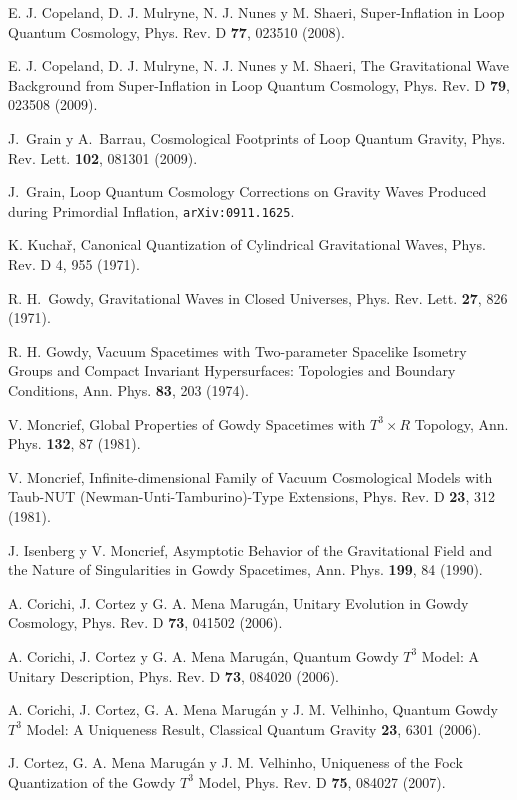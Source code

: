 \begin{thebibliography}{999}
 E. J. Copeland, D. J. Mulryne, N. J. Nunes y M. Shaeri, Super-Inflation in Loop
Quantum Cosmology, Phys. Rev. D {\bf77}, 023510 (2008).


 E. J. Copeland, D. J. Mulryne, N. J. Nunes y M. Shaeri, The Gravitational Wave
Background from Super-Inflation in Loop Quantum Cosmology, Phys. Rev. D {\bf79}, 023508 (2009).


 J.~Grain y A.~Barrau, Cosmological Footprints of Loop Quantum
Gravity, Phys. Rev. Lett. {\bf 102}, 081301 (2009).

 J.~Grain, Loop Quantum Cosmology Corrections on Gravity Waves Produced during
Primordial Inflation, \texttt{arXiv:0911.1625}.



 K. Kucha\v{r}, Canonical
Quantization of Cylindrical Gravitational Waves, Phys. Rev. D {\bf}4, 955 (1971).

 R. H.~Gowdy, {Gravitational Waves in Closed Universes},
Phys. Rev. Lett. \textbf{27}, 826 (1971).

 R. H. Gowdy, Vacuum Spacetimes with Two-parameter Spacelike Isometry Groups and
Compact Invariant Hypersurfaces: Topologies and Boundary Conditions, Ann. Phys. {\bf83}, 203 (1974).

 V. Moncrief, Global Properties of Gowdy Spacetimes with $T^3\times R$ Topology, Ann.
Phys. {\bf 132}, 87 (1981).

 V. Moncrief, Infinite-dimensional Family of Vacuum Cosmological Models with Taub-NUT
(Newman-Unti-Tamburino)-Type Extensions, Phys. Rev. D {\bf23}, 312 (1981).

 J. Isenberg y V. Moncrief, Asymptotic Behavior of the Gravitational Field and the
Nature of Singularities in Gowdy Spacetimes, Ann. Phys. {\bf 199}, 84 (1990).

A. Corichi, J. Cortez y G. A. Mena Marug\'{a}n, Unitary Evolution in Gowdy
Cosmology, Phys. Rev. D {\bf73}, 041502 (2006).

A. Corichi, J. Cortez y G. A. Mena Marug\'{a}n, Quantum Gowdy $T^3$ Model: A Unitary Description,
Phys. Rev. D {\bf73}, 084020 (2006).

 A. Corichi, J. Cortez, G. A. Mena Marug\'{a}n y J. M. Velhinho, Quantum Gowdy
$T^3$ Model: A Uniqueness Result, Classical Quantum Gravity {\bf23}, 6301 (2006).

 J. Cortez, G. A. Mena Marug\'{a}n y J. M. Velhinho, Uniqueness of the Fock
Quantization of the Gowdy $T^3$ Model,  Phys. Rev. D {\bf75}, 084027 (2007).


\end{thebibliography}
